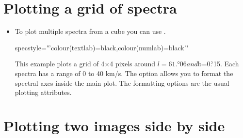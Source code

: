\documentclass[11pt,oneside,chapters]{starlink}
\newcommand{\dgs}{\si{\degree}}%
\newcommand{\dgs}{\HCode{&deg}}
\providecommand{\udeg}{\hspace{-0.3em}\dgs\hspace{-0.08em}}
\begin{document}

\section{Plotting a grid of spectra}
\begin{itemize}
\item To plot multiple spectra from a cube you can use \clinplot.

\begin{terminalv}
  specstyle="'colour(textlab)=black,colour(numlab)=black'"
\end{terminalv}

This example plots a grid of 4$\times$4 pixels around $l=61.$\udeg$06
and $b=0.$\udeg$15. Each spectra has a range of 0 to 40 km/s.  The
 option allows you to format the spectral axes inside
the main plot. The formatting options are the usual plotting
attributes.
\end{itemize}


\section{Plotting two images side by side}
\end{document}
